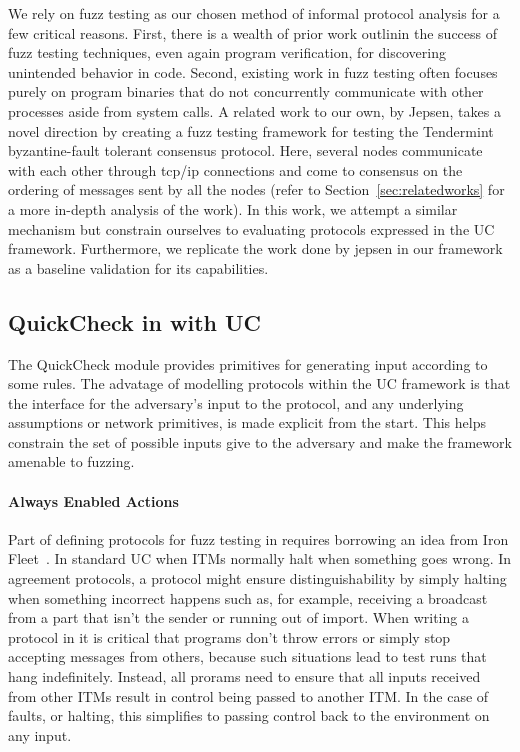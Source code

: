 We rely on fuzz testing as our chosen method of informal protocol analysis for a few critical reasons. 
First, there is a wealth of prior work outlinin the success of fuzz testing techniques, even again program verification, for discovering unintended behavior in code.
Second, existing work in fuzz testing often focuses purely on program binaries that do not concurrently communicate with other processes aside from system calls.
A related work to our own, by Jepsen, takes a novel direction by creating a fuzz testing framework for testing the Tendermint byzantine-fault tolerant consensus protocol. 
Here, several nodes communicate with each other through tcp/ip connections and come to consensus on the ordering of messages sent by all the nodes (refer to Section~\ref{sec:relatedworks} for a more in-depth analysis of the work). 
In this work, we attempt a similar mechanism but constrain ourselves to evaluating protocols expressed in the UC framework.
Furthermore, we replicate the work done by jepsen in our framework as a baseline validation for its capabilities. 

\subsection{QuickCheck in with UC}
The QuickCheck module provides primitives for generating input according to some rules. 
The advatage of modelling protocols within the UC framework is that the interface for the adversary's input to the protocol, and any underlying assumptions or network primitives, is made explicit from the start.
This helps constrain the set of possible inputs give to the adversary and make the framework amenable to fuzzing.

\paragraph{Always Enabled Actions}
Part of defining protocols for fuzz testing in \us requires borrowing an idea from Iron Fleet~\cite{ironfleet}.
In standard UC when ITMs normally halt when something goes wrong.
In agreement protocols, a protocol might ensure distinguishability by simply halting when something incorrect happens such as, for example, receiving a broadcast from a part that isn't the sender or running out of import. 
When writing a protocol in \us it is critical that programs don't throw errors or simply stop accepting messages from others, because such situations lead to test runs that hang indefinitely. 
Instead, all prorams need to ensure that all inputs received from other ITMs result in control being passed to another ITM.
In the case of faults, or halting, this simplifies to passing control back to the environment on any input.  



